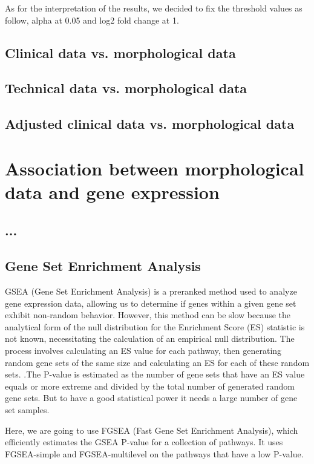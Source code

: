 \documentclass[a4paper, 11pt]{article}
\begin{document}
\begin{multicols}{2}
As for the interpretation of the results, we decided to fix the threshold values as follow, alpha at 0.05 and log2 fold change at 1.


\subsection{Clinical data vs. morphological data}
\subsection{Technical data vs. morphological data}
\subsection{Adjusted clinical data vs. morphological data}

\section{Association between morphological data and gene expression}
\subsection{...}
\subsection{Gene Set Enrichment Analysis}
GSEA (Gene Set Enrichment Analysis) is a preranked method used to analyze gene expression data, allowing us to determine if genes within a given gene set exhibit non-random behavior. However, this method can be slow because the analytical form of the null distribution for the Enrichment Score (ES) statistic is not known, necessitating the calculation of an empirical null distribution.
The process involves calculating an ES value for each pathway, then generating random gene sets of the same size and calculating an ES for each of these random sets. .The P-value is estimated as the number of gene sets that have an ES value equals or more extreme and divided by the total number of generated random gene sets. But to have a good statistical power it needs a large number of gene set samples.

Here, we are going to use FGSEA (Fast Gene Set Enrichment Analysis), which efficiently estimates the GSEA P-value for a collection of pathways. It uses FGSEA-simple and FGSEA-multilevel on the pathways that have a low P-value.


\end{multicols}
\end{document}
